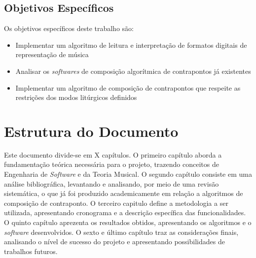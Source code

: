       \subsection*{Objetivos Específicos}

        Os objetivos específicos deste trabalho são:

        \begin{itemize}
          \item Implementar um algoritmo de leitura e interpretação de formatos digitais de representação de música
          \item Analisar os \textit{softwares} de composição algorítmica de contrapontos já existentes
          \item Implementar um algoritmo de composição de contrapontos que respeite as restrições dos modos litúrgicos definidos
        \end{itemize}

  \section*{Estrutura do Documento}

    Este documento divide-se em X capítulos. O primeiro capítulo aborda a fundamentação teórica necessária para o projeto, trazendo conceitos de Engenharia de \textit{Software} e da Teoria Musical. O segundo capítulo consiste em uma análise bibliográfica, levantando e analisando, por meio de uma revisão sistemática, o que já foi produzido academicamente em relação a algoritmos de composição de contraponto. O terceiro capitulo define a metodologia a ser utilizada, apresentando cronograma e a descrição específica das funcionalidades. O quinto capítulo aprezenta os resultados obtidos, apresentando os algoritmos e o \textit{software} desenvolvidos. O sexto e último capítulo traz as considerações finais, analisando o nível de sucesso do projeto e apresentando possibilidades de trabalhos futuros.
